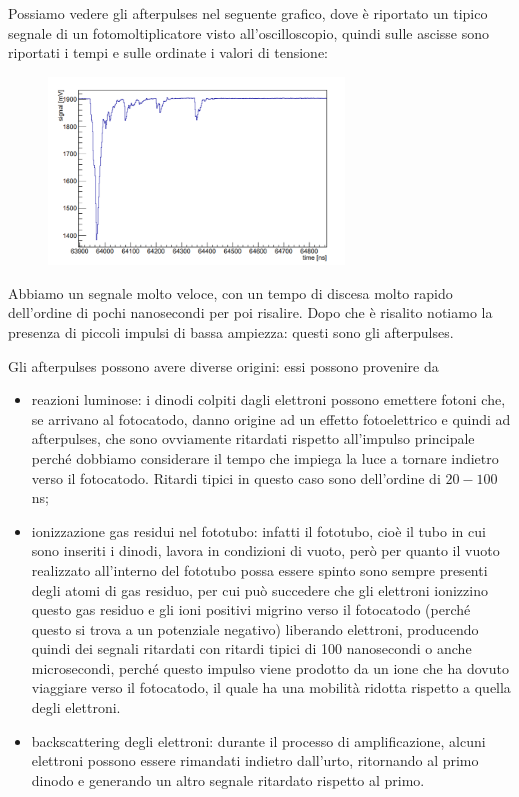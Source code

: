 Possiamo vedere gli afterpulses nel seguente grafico, dove è riportato un tipico segnale di un fotomoltiplicatore visto all'oscilloscopio, quindi sulle ascisse sono riportati i tempi e sulle ordinate i valori di tensione:
\begin{figure}[H]
   \centering
   \includegraphics[width=0.7\textwidth]{immagini/afterpulses.png}
\end{figure}
Abbiamo un segnale molto veloce, con un tempo di discesa molto rapido dell'ordine di pochi nanosecondi per poi risalire. Dopo che è risalito notiamo la presenza di piccoli impulsi di bassa ampiezza: questi sono gli afterpulses.

Gli afterpulses possono avere diverse origini: essi possono provenire da
\begin{itemize}[leftmargin=0.5cm]
   \item reazioni luminose: i dinodi colpiti dagli elettroni possono emettere fotoni che, se arrivano al fotocatodo, danno origine ad un effetto fotoelettrico e quindi ad afterpulses, che sono ovviamente ritardati rispetto all'impulso principale perché dobbiamo considerare il tempo che impiega la luce a tornare indietro verso il fotocatodo. Ritardi tipici in questo caso sono dell'ordine di $20-100$ ns;
   \item ionizzazione gas residui nel fototubo: infatti il fototubo, cioè il tubo in cui sono inseriti i dinodi, lavora in condizioni di vuoto, però per quanto il vuoto realizzato all'interno del fototubo possa essere spinto sono sempre presenti degli atomi di gas residuo, per cui può succedere che gli elettroni ionizzino questo gas residuo e gli ioni positivi migrino verso il fotocatodo (perché questo si trova a un potenziale negativo) liberando elettroni, producendo quindi dei segnali ritardati con ritardi tipici di 100 nanosecondi o anche microsecondi, perché questo impulso viene prodotto da un ione che ha dovuto viaggiare verso il fotocatodo, il quale ha una mobilità ridotta rispetto a quella degli elettroni.
   \item backscattering degli elettroni: durante il processo di amplificazione, alcuni elettroni possono essere rimandati indietro dall'urto, ritornando al primo dinodo e generando un altro segnale ritardato rispetto al primo.
\end{itemize}


